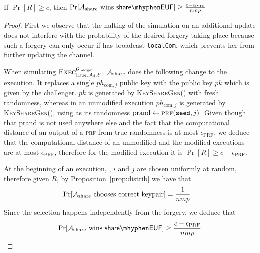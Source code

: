   \begin{proposition}
  \label{prop:forgery:share}
    If $\Pr[R] \geq c$, then $\Pr[\adversary_{\mathrm{share}} \text{ wins }
    \mathsf{share \mhyphen EUF}] \geq \frac{c - \epsilon_{\mathrm{PRF}}}{nmp}$
  \end{proposition}

  \begin{proof}
    First we observe that the halting of the simulation on an additional update
    does not interfere with the probability of the desired forgery taking place
    because such a forgery can only occur if \alice{} has broadcast
    \texttt{localCom}, which prevents her from further updating the channel.

    When simulating $\textsc{Exec}^{\mathcal{G}_{\mathrm{Ledger}}}_{\Pi_{\mathrm{LN}},
    \mathcal{A}_{\mathrm{d}}, \mathcal{E}}$, $\mathcal{A}_{\mathrm{share}}$ does
    the following change to the execution. It replaces a single
    $ph_{\mathrm{com}, j}$ public key with the public key $pk$ which is given by
    the challenger. $pk$ is generated by \textsc{KeyShareGen}() with fresh
    randomness, whereas in an unmodified execution $ph_{\mathrm{com}, j}$ is
    generated by \textsc{KeyShareGen}(), using as its randomness $\mathrm{prand}
    \gets \textsc{prf}(\mathtt{seed}, j)$. Given though that prand is not used
    anywhere else and the fact that the computational distance of an output of a
    \textsc{prf} from true randomness is at most $\epsilon_{\mathrm{PRF}}$, we
    deduce that the computational distance of an unmodified and the modified
    executions are at most $\epsilon_{\mathrm{PRF}}$, therefore for the modified
    execution it is $\Pr[R] \geq c - \epsilon_{\mathrm{PRF}}$.

    At the beginning of an execution, \alice, $i$ and $j$ are chosen uniformly
    at random, therefore given $R$, by Proposition~\ref{prop:distrib} we have
    that
    \begin{equation*}
      \Pr[\mathcal{A}_{\mathrm{share}} \text{ chooses correct keypair}] =
      \frac{1}{nmp} \enspace.
    \end{equation*}
    Since the selection happens independently from the forgery, we deduce that
    \begin{equation*}
      \Pr[\adversary_{\mathrm{share}} \text{ wins } \mathsf{share \mhyphen EUF}]
      \geq \frac{c - \epsilon_{\mathrm{PRF}}}{nmp}
    \end{equation*}
  \end{proof}

